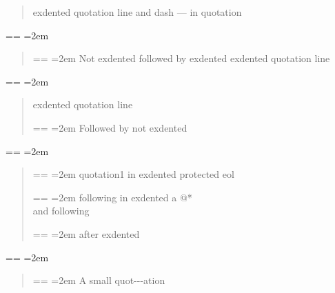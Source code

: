 \documentclass{book}
\makeatletter
\newenvironment{GNUTexinfopreformatted}{%
  \par\obeylines\obeyspaces\frenchspacing
  \parskip=\z@\parindent=\z@}{}
\makeatother
\begin{document}
\begin{quote}
\noindent exdented quotation line   and dash --- in quotation
\end{quote}
\begin{GNUTexinfopreformatted}
\leftskip=2em\relax\ttfamily%

\end{GNUTexinfopreformatted}
\begin{quote}
\begin{GNUTexinfopreformatted}
\leftskip=2em\relax\ttfamily%
Not exdented followed by exdented
\end{GNUTexinfopreformatted}
\noindent exdented quotation line
\end{quote}
\begin{GNUTexinfopreformatted}
\leftskip=2em\relax\ttfamily%

\end{GNUTexinfopreformatted}
\begin{quote}
\noindent exdented quotation line
\begin{GNUTexinfopreformatted}
\leftskip=2em\relax\ttfamily%
Followed by not exdented 
\end{GNUTexinfopreformatted}
\end{quote}
\begin{GNUTexinfopreformatted}
\leftskip=2em\relax\ttfamily%

\end{GNUTexinfopreformatted}
\begin{quote}
\begin{GNUTexinfopreformatted}
\leftskip=2em\relax\ttfamily%
quotation1
\end{GNUTexinfopreformatted}
\noindent in exdented protected eol \ {}
\begin{GNUTexinfopreformatted}
\leftskip=2em\relax\ttfamily%
following
\end{GNUTexinfopreformatted}
\noindent in exdented a @* \leavevmode{}\\ and following
\begin{GNUTexinfopreformatted}
\leftskip=2em\relax\ttfamily%
after exdented
\end{GNUTexinfopreformatted}
\end{quote}
\begin{GNUTexinfopreformatted}
\leftskip=2em\relax\ttfamily%

\end{GNUTexinfopreformatted}
\begin{quote}
\begin{footnotesize}
\begin{GNUTexinfopreformatted}
\leftskip=2em\relax\ttfamily%
A small quot{-}{-}{-}ation
\end{GNUTexinfopreformatted}
\end{footnotesize}
\end{quote}
\end{document}
